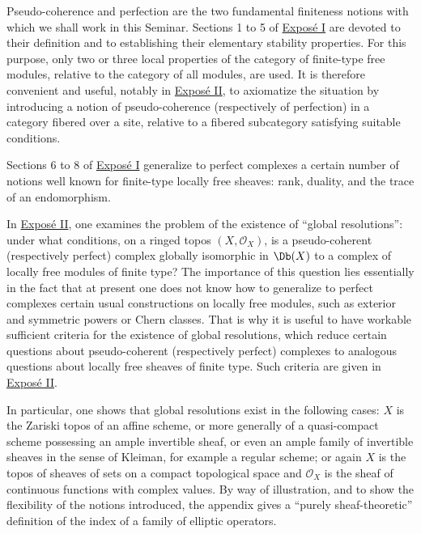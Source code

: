 Pseudo-coherence and perfection are the two fundamental finiteness notions with which we shall work in this Seminar. Sections 1 to 5 of \hyperlink{sga6.e01.expose}{Exposé I} are devoted to their definition and to establishing their elementary stability properties. For this purpose, only two or three local properties of the category of finite-type free modules, relative to the category of all modules, are used. It is therefore convenient and useful, notably in \hyperlink{sga6.e02.expose}{Exposé II}, to axiomatize the situation by introducing a notion of pseudo-coherence (respectively of perfection) in a category fibered over a site, relative to a fibered subcategory satisfying suitable conditions.

Sections 6 to 8 of \hyperlink{sga6.e01.expose}{Exposé I} generalize to perfect complexes a certain number of notions well known for finite-type locally free sheaves: rank, duality, and the trace of an endomorphism.

In \hyperlink{sga6.e02.expose}{Exposé II}, one examines the problem of the existence of ``global resolutions'': under what conditions, on a ringed topos \((X,\mathcal O_X)\), is a pseudo-coherent (respectively perfect) complex globally isomorphic in \(\Db(X)\) to a complex of locally free modules of finite type? The importance of this question lies essentially in the fact that at present one does not know how to generalize to perfect complexes certain usual constructions on locally free modules, such as exterior and symmetric powers or Chern classes. That is why it is useful to have workable sufficient criteria for the existence of global resolutions, which reduce certain questions about pseudo-coherent (respectively perfect) complexes to analogous questions about locally free sheaves of finite type. Such criteria are given in \hyperlink{sga6.e02.expose}{Exposé II}.

In particular, one shows that global resolutions exist in the following cases: \(X\) is the Zariski topos of an affine scheme, or more generally of a quasi-compact scheme possessing an ample invertible sheaf, or even an ample family of invertible sheaves in the sense of Kleiman, for example a regular scheme; or again \(X\) is the topos of sheaves of sets on a compact topological space and \(\mathcal O_X\) is the sheaf of continuous functions with complex values. By way of illustration, and to show the flexibility of the notions introduced, the appendix gives a ``purely sheaf-theoretic'' definition of the index of a family of elliptic operators.


